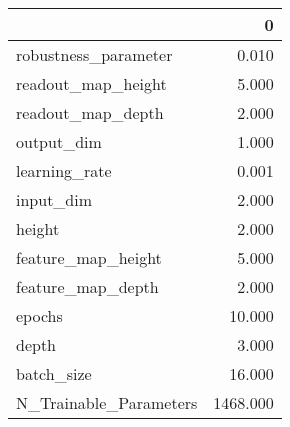 \begin{tabular}{lr}
\toprule
{} &         0 \\
\midrule
robustness\_parameter   &     0.010 \\
readout\_map\_height     &     5.000 \\
readout\_map\_depth      &     2.000 \\
output\_dim             &     1.000 \\
learning\_rate          &     0.001 \\
input\_dim              &     2.000 \\
height                 &     2.000 \\
feature\_map\_height     &     5.000 \\
feature\_map\_depth      &     2.000 \\
epochs                 &    10.000 \\
depth                  &     3.000 \\
batch\_size             &    16.000 \\
N\_Trainable\_Parameters &  1468.000 \\
\bottomrule
\end{tabular}
